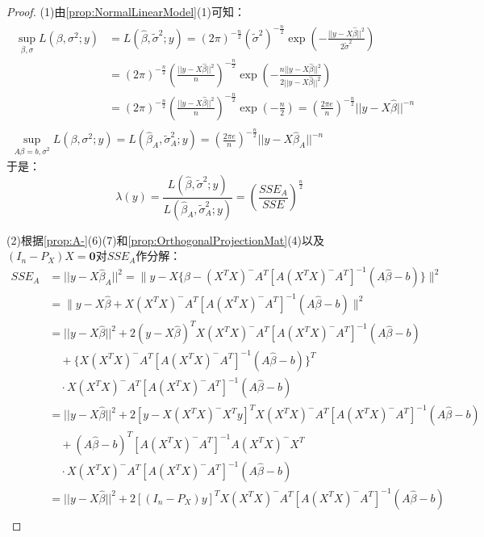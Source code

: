 \begin{proof}
	(1)由\cref{prop:NormalLinearModel}(1)可知：
	\begin{gather*}
		\begin{aligned}
			\sup_{\beta,\sigma}L(\beta,\sigma^2;y)&=L(\hat{\beta},\tilde{\sigma}^2;y)=(2\pi)^{-\frac{n}{2}}(\tilde{\sigma}^2)^{-\frac{n}{2}}\exp\left(-\frac{||y-X\hat{\beta}||^2}{2\tilde{\sigma}^2}\right) \\
			&=(2\pi)^{-\frac{n}{2}}\left(\frac{||y-X\hat{\beta}||^2}{n}\right)^{-\frac{n}{2}}\exp\left(-\frac{n||y-X\hat{\beta}||^2}{2||y-X\hat{\beta}||^2}\right) \\
			&=(2\pi)^{-\frac{n}{2}}\left(\frac{||y-X\hat{\beta}||^2}{n}\right)^{-\frac{n}{2}}\exp\left(-\frac{n}{2}\right)=\left(\frac{2\pi e}{n}\right)^{-\frac{n}{2}}||y-X\hat{\beta}||^{-n}
		\end{aligned} \\
		\sup_{A\beta=b,\sigma^2}L(\beta,\sigma^2;y)=L(\hat{\beta}_A,\tilde{\sigma}_A^2;y)=\left(\frac{2\pi e}{n}\right)^{-\frac{n}{2}}||y-X\hat{\beta}_A||^{-n}
	\end{gather*}
	于是：
	\begin{equation*}
		\lambda(y)=\frac{L(\hat{\beta},\tilde{\sigma}^2;y)}{L(\hat{\beta}_A,\tilde{\sigma}_A^2;y)}=\left(\frac{SSE_A}{SSE}\right)^\frac{n}{2}
	\end{equation*}\par
	(2)根据\cref{prop:A-}(6)(7)和\cref{prop:OrthogonalProjectionMat}(4)以及$(I_n-P_X)X=\mathbf{0}$对$SSE_A$作分解：
	\begin{align*}
		SSE_A&=||y-X\hat{\beta}_A||^2=\Big\|y-X\{\hat{\beta}-(X^TX)^-A^T[A(X^TX)^-A^T]^{-1}(A\hat{\beta}-b)\}\Big\|^2 \\
		&=\Big\|y-X\hat{\beta}+X(X^TX)^-A^T[A(X^TX)^-A^T]^{-1}(A\hat{\beta}-b)\Big\|^2 \\
		&=||y-X\hat{\beta}||^2+2(y-X\hat{\beta})^TX(X^TX)^-A^T[A(X^TX)^-A^T]^{-1}(A\hat{\beta}-b) \\
		&\quad+\{X(X^TX)^-A^T[A(X^TX)^-A^T]^{-1}(A\hat{\beta}-b)\}^T \\
		&\quad\cdot X(X^TX)^-A^T[A(X^TX)^-A^T]^{-1}(A\hat{\beta}-b) \\
		&=||y-X\hat{\beta}||^2+2[y-X(X^TX)^-X^Ty]^TX(X^TX)^-A^T[A(X^TX)^-A^T]^{-1}(A\hat{\beta}-b) \\
		&\quad+(A\hat{\beta}-b)^T[A(X^TX)^-A^T]^{-1}A(X^TX)^-X^T \\
		&\quad\cdot X(X^TX)^-A^T[A(X^TX)^-A^T]^{-1}(A\hat{\beta}-b) \\
		&=||y-X\hat{\beta}||^2+2[(I_n-P_X)y]^TX(X^TX)^-A^T[A(X^TX)^-A^T]^{-1}(A\hat{\beta}-b) \\

\end{align*}
\end{proof}
